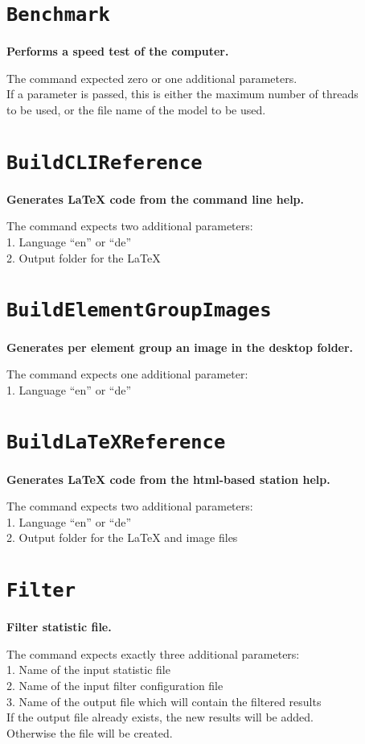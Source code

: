 \section{\texttt{Benchmark}}

\textbf{Performs a speed test of the computer.}

The command expected zero or one additional parameters.\\
If a parameter is passed, this is either the maximum number of threads\\
to be used, or the file name of the model to be used.

\section{\texttt{BuildCLIReference}}

\textbf{Generates LaTeX code from the command line help.}

The command expects two additional parameters:\\
1. Language "`en"' or "`de"'\\
2. Output folder for the LaTeX

\section{\texttt{BuildElementGroupImages}}

\textbf{Generates per element group an image in the desktop folder.}

The command expects one additional parameter:\\
1. Language "`en"' or "`de"'

\section{\texttt{BuildLaTeXReference}}

\textbf{Generates LaTeX code from the html-based station help.}

The command expects two additional parameters:\\
1. Language "`en"' or "`de"'\\
2. Output folder for the LaTeX and image files

\section{\texttt{Filter}}

\textbf{Filter statistic file.}

The command expects exactly three additional parameters:\\
1. Name of the input statistic file\\
2. Name of the input filter configuration file\\
3. Name of the output file which will contain the filtered results\\
If the output file already exists, the new results will be added.\\
Otherwise the file will be created.

